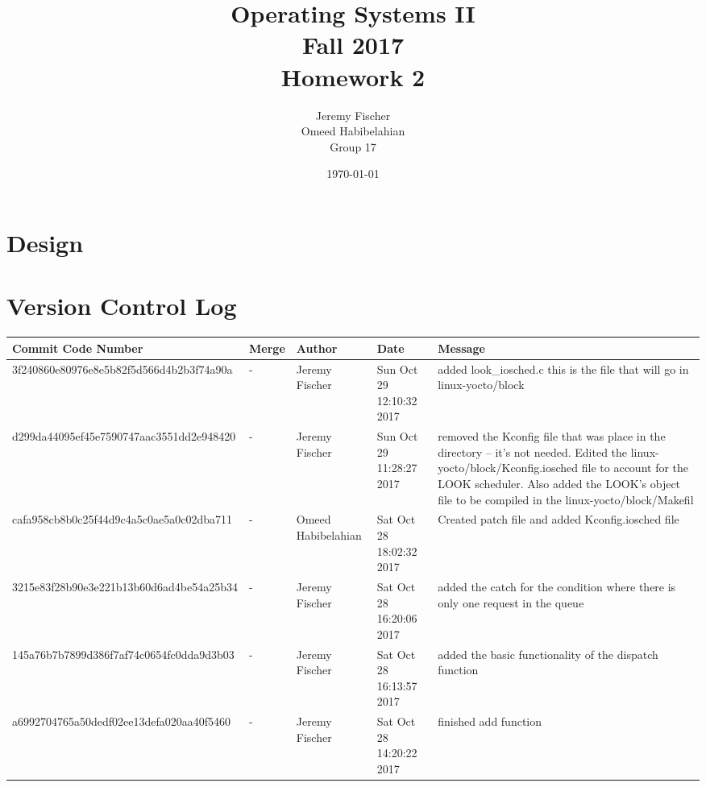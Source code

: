 \documentclass[draftclsnofoot, onecolumn, 10pt, compsoc]{IEEEtran}
\title{\textbf{Operating Systems II}\\Fall 2017\\Homework 2}
\author{Jeremy Fischer\\Omeed Habibelahian\\Group 17}
\date{\today}
\begin{document}
	\maketitle
	\newpage

	\section{Design}

	\section{Version Control Log}
		\begin{tabular}{| p{6.8cm} | p{1.3cm} | p{2.5cm} | p{2cm} | p{4.2cm} |}
			\hline
			Commit Code Number & Merge & Author & Date & Message \\ \hline

			3f240860e80976e8e5b82f5d566d4b2b3f74a90a
			& -
			& Jeremy Fischer
			& Sun Oct 29 12:10:32 2017
			& added look\_iosched.c this is the file that will go in linux-yocto/block \\
			\hline

			d299da44095ef45e7590747aac3551dd2e948420
			& -
			& Jeremy Fischer
			& Sun Oct 29 11:28:27 2017
			& removed the Kconfig file that was place in the directory -- it's not needed. Edited the linux-yocto/block/Kconfig.iosched file to account for the LOOK scheduler. Also added the LOOK's object file to be compiled in the linux-yocto/block/Makefil \\
			\hline

			cafa958cb8b0c25f44d9c4a5c0ae5a0c02dba711
			& -
			& Omeed Habibelahian
			& Sat Oct 28 18:02:32 2017
			& Created patch file and added Kconfig.iosched file \\
			\hline

			3215e83f28b90e3e221b13b60d6ad4be54a25b34
			& -
			& Jeremy Fischer
			& Sat Oct 28 16:20:06 2017
			& added the catch for the condition where there is only one request in the queue \\
			\hline

			145a76b7b7899d386f7af74c0654fc0dda9d3b03
			& -
			& Jeremy Fischer
			& Sat Oct 28 16:13:57 2017
			& added the basic functionality of the dispatch function \\
			\hline

			a6992704765a50dedf02ee13defa020aa40f5460
			& -
			& Jeremy Fischer
			& Sat Oct 28 14:20:22 2017
			& finished add function \\
			\hline


\end{tabular}
\end{document}
